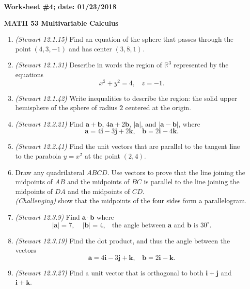 \documentclass{article}
\begin{document}
{\bf Worksheet \#4; date: 01/23/2018}

{\bf MATH 53 Multivariable Calculus}

\begin{enumerate}
\item {\em (Stewart 12.1.15)} Find an equation of the sphere that passes through the point $(4, 3, -1)$ and has center $(3, 8, 1)$.

\item {\em (Stewart 12.1.31)} Describe in words the region of $\mathbb{R}^3$ represented by the equations
\[
x^2 + y^2 = 4, ~~~~ z = -1.
\]

\item {\em (Stewart 12.1.42)} Write inequalities to describe the region: the solid upper hemisphere of the sphere of radius $2$ centered at the origin.

\item {\em (Stewart 12.2.21)} Find $\mathbf{a} + \mathbf{b}$, $4\mathbf{a} + 2\mathbf{b}$, $|\mathbf{a}|$, and $|\mathbf{a} - \mathbf{b}|$, where
\[
\mathbf{a} = 4\mathbf{i} - 3\mathbf{j} + 2\mathbf{k}, ~~~~ \mathbf{b} = 2\mathbf{i} - 4\mathbf{k}.
\]

\item {\em (Stewart 12.2.41)} Find the unit vectors that are parallel to the tangent line to the parabola $y = x^2$ at the point $(2, 4)$.

\item Draw any quadrilateral $ABCD$. Use vectors to prove that the line joining the midpoints of $AB$ and the midpoints of $BC$ is parallel to the line joining the midpoints of $DA$ and the midpoints of $CD$. \\
{\em (Challenging)} show that the midpoints of the four sides form a parallelogram.

\item {\em (Stewart 12.3.9)} Find $\mathbf{a} \cdot \mathbf{b}$ where
\[
|\mathbf{a}| = 7, ~~~~~ |\mathbf{b}| = 4, ~~~~ \text{the angle between } \mathbf{a} \text{ and } \mathbf{b} \text{ is } 30^\circ.
\]

\item {\em (Stewart 12.3.19)} Find the dot product, and thus the angle between the vectors
\[
\mathbf{a} = 4\mathbf{i} - 3\mathbf{j} + \mathbf{k}, ~~~~ \mathbf{b} = 2\mathbf{i} - \mathbf{k}.
\]

\item {\em (Stewart 12.3.27)} Find a unit vector that is orthogonal to both $\mathbf{i} + \mathbf{j}$ and $\mathbf{i} + \mathbf{k}$.
\end{enumerate}
\end{document}
